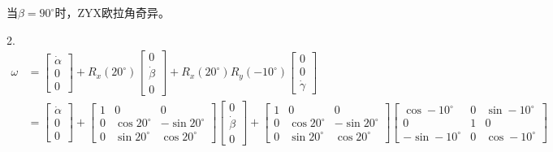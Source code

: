 \documentclass[UTF8, 13pt]{ctexart}
\begin{document}
当\(\beta = 90^\circ\)时，ZYX欧拉角奇异。
\newpage

2.
\[
\begin{aligned}
    \omega &= \begin{bmatrix}
                \dot{\alpha} \\
                0 \\
                0
            \end{bmatrix}
            + R_x(20^\circ)
            \begin{bmatrix}
                0 \\
                \dot{\beta} \\
                0
            \end{bmatrix}
            + R_x(20^\circ)R_y(-10^\circ)
            \begin{bmatrix}
                0 \\
                0 \\
                \dot{\gamma}
            \end{bmatrix} \\
    &= \begin{bmatrix}
        \dot{\alpha} \\
        0 \\
        0
        \end{bmatrix}
        + \begin{bmatrix}
            1 & 0 & 0 \\
            0 & \cos20^\circ & -\sin20^\circ \\
            0 & \sin20^\circ & \cos20^\circ
        \end{bmatrix}
        \begin{bmatrix}
            0 \\
            \dot{\beta} \\
            0
        \end{bmatrix}
        + \begin{bmatrix}
            1 & 0 & 0 \\
            0 & \cos20^\circ & -\sin20^\circ \\
            0 & \sin20^\circ & \cos20^\circ
        \end{bmatrix}
        \begin{bmatrix}
            \cos-10^\circ & 0 & \sin-10^\circ \\
            0 & 1 & 0 \\
            -\sin-10^\circ & 0 & \cos-10^\circ
        \end{bmatrix}

\end{aligned}\]
\end{document}
